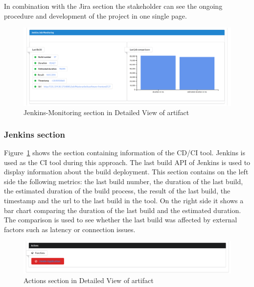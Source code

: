 In combination with the Jira section the stakeholder can see the ongoing procedure and development of the project in one single page.

\begin{figure}[htpb]
  \centering
  \includegraphics[width=1.0\textwidth]{figures/pivio-detailview-jenkins.png} \caption{Jenkins-Monitoring section in Detailed View of artifact}
  \label{fig:pivio-detailedview-jenkins}
\end{figure}
\subsubsection{Jenkins section}

Figure~\ref{fig:pivio-detailedview-jenkins} shows the section containing information of the CD/CI tool. Jenkins is used as the CI tool during this approach. The last build API of Jenkins is used to display information about the build deployment. This section contains on the left side the following metrics: the last build number, the duration of the last build, the estimated duration of the build process, the result of the last build, the timestamp and the url to the last build in the tool. On the right side it shows a bar chart comparing the duration of the last build and the estimated duration. The comparison is used to see whether the last build was affected by external factors such as latency or connection issues.

\begin{figure}[htpb]
  \centering
  \includegraphics[width=1.0\textwidth]{figures/pivio-detailview-actions.PNG} \caption{Actions section in Detailed View of artifact}
  \label{fig:pivio-detailedview-actions}
\end{figure}
